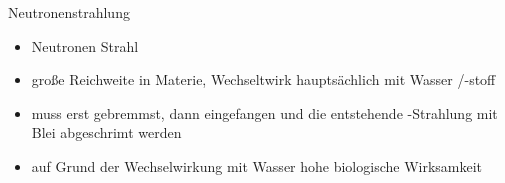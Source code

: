 \begin{frame}{Neutronenstrahlung}
\begin{itemize}
	\item Neutronen Strahl
	\item große Reichweite in Materie, Wechseltwirk hauptsächlich mit Wasser /-stoff
	\item muss erst gebremmst, dann eingefangen und die entstehende \gamma-Strahlung mit Blei abgeschrimt werden
	\item auf Grund der Wechselwirkung mit Wasser hohe biologische Wirksamkeit
\end{itemize}
\end{frame}
\nocite{BfS}
